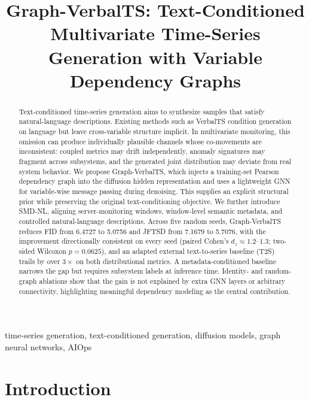\documentclass[conference]{IEEEtran}
\begin{document}
\title{Graph-VerbalTS: Text-Conditioned Multivariate Time-Series Generation with Variable Dependency Graphs}

\author{
}

\maketitle

\begin{abstract}
Text-conditioned time-series generation aims to synthesize samples that satisfy natural-language descriptions. Existing methods such as VerbalTS condition generation on language but leave cross-variable structure implicit. In multivariate monitoring, this omission can produce individually plausible channels whose co-movements are inconsistent: coupled metrics may drift independently, anomaly signatures may fragment across subsystems, and the generated joint distribution may deviate from real system behavior. We propose Graph-VerbalTS, which injects a training-set Pearson dependency graph into the diffusion hidden representation and uses a lightweight GNN for variable-wise message passing during denoising. This supplies an explicit structural prior while preserving the original text-conditioning objective. We further introduce SMD-NL, aligning server-monitoring windows, window-level semantic metadata, and controlled natural-language descriptions. Across five random seeds, Graph-VerbalTS reduces FID from 6.4727 to 5.0756 and JFTSD from 7.1679 to 5.7076, with the improvement directionally consistent on every seed (paired Cohen's $d_z\approx1.2$--$1.3$; two-sided Wilcoxon $p=0.0625$), and an adapted external text-to-series baseline (T2S) trails by over $3\times$ on both distributional metrics. A metadata-conditioned baseline narrows the gap but requires subsystem labels at inference time. Identity- and random-graph ablations show that the gain is not explained by extra GNN layers or arbitrary connectivity, highlighting meaningful dependency modeling as the central contribution.
\end{abstract}

\begin{IEEEkeywords}
time-series generation, text-conditioned generation, diffusion models, graph neural networks, AIOps
\end{IEEEkeywords}

\section{Introduction}
\end{document}
